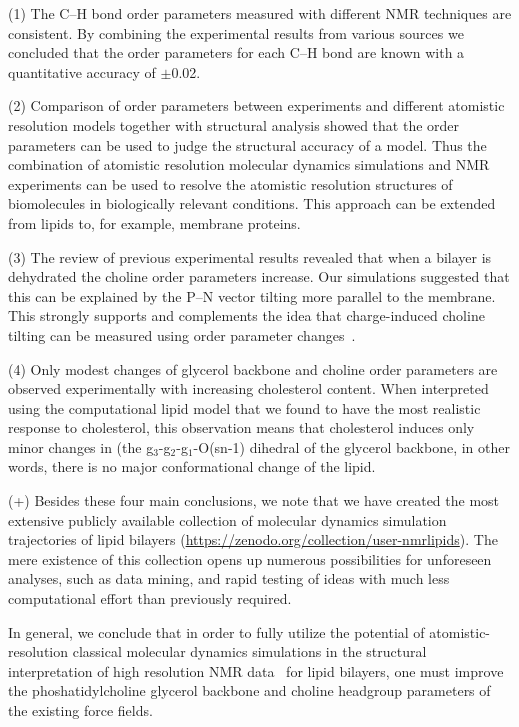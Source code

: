 \documentclass[journal=jpcbfk,manuscript=article]{achemso}
\begin{document}
(1) The C--H bond order parameters measured with different NMR techniques are consistent.
By combining the experimental results from various sources we concluded
that the order parameters for each C--H bond are known with a quantitative accuracy of $\pm$0.02.

(2) Comparison of order parameters between experiments and different atomistic resolution models 
together with structural analysis showed that the order parameters can be used
to judge the structural accuracy of a model. Thus the combination of atomistic resolution 
molecular dynamics simulations and NMR experiments can be used to resolve the atomistic resolution
structures of biomolecules in biologically relevant conditions. 
This approach can be extended from lipids to, for example, membrane proteins.

(3) The review of previous experimental results revealed that when a bilayer is dehydrated the 
choline order parameters increase. Our simulations suggested that
this can be explained by the P--N vector tilting more parallel to the membrane. 
This strongly supports and complements the idea that charge-induced choline tilting
can be measured using order parameter changes~\cite{ionpaper,scherer89}.

(4) Only modest changes of glycerol backbone and choline order parameters are observed experimentally with increasing cholesterol content.
When interpreted using the computational lipid model that we found to have the most realistic response to cholesterol,
this observation means that cholesterol induces only minor changes in (the g$_3$-g$_2$-g$_1$-O(sn-1)
dihedral of the glycerol backbone, in other words, there is no major conformational change of the lipid.

(+) Besides these four main conclusions, we note that we have created the most extensive
publicly available collection of molecular dynamics simulation trajectories of lipid bilayers
(\url{https://zenodo.org/collection/user-nmrlipids}). The mere existence of
this collection opens up numerous possibilities for unforeseen analyses, such as data mining,
and rapid testing of ideas with
much less computational effort than previously required.

In general, we conclude that in order to fully utilize the potential of atomistic-resolution classical molecular dynamics simulations
in the structural interpretation of high resolution NMR data~\cite{ferreira14} for lipid bilayers, one must  
improve the phoshatidylcholine glycerol backbone and choline headgroup parameters of the existing force fields.
\end{document}
